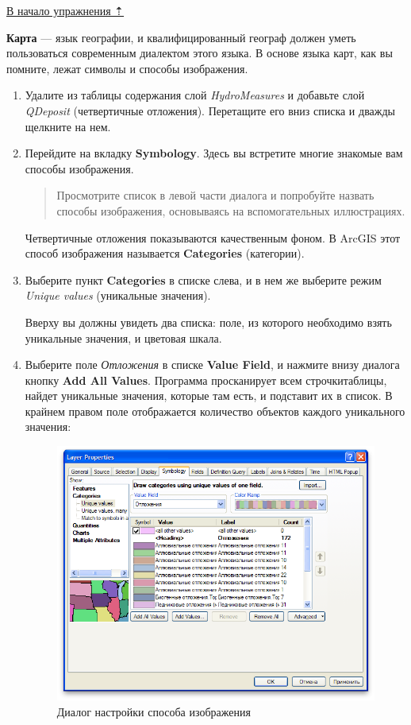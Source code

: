 \documentclass[]{book}
\theoremstyle{definition}
\theoremstyle{definition}
\theoremstyle{definition}
\theoremstyle{remark}
\begin{document}
\protect\hyperlink{map-design-quaternary}{В начало упражнения ⇡}

\textbf{Карта} --- язык географии, и квалифицированный географ должен
уметь пользоваться современным диалектом этого языка. В основе языка
карт, как вы помните, лежат символы и способы изображения.

\begin{enumerate}
\def\labelenumi{\arabic{enumi}.}
\item
  Удалите из таблицы содержания слой \emph{HydroMeasures} и добавьте
  слой \emph{QDeposit} (четвертичные отложения). Перетащите его вниз
  списка и дважды щелкните на нем.
\item
  Перейдите на вкладку \textbf{Symbology}. Здесь вы встретите многие
  знакомые вам способы изображения.

  \begin{quote}
  Просмотрите список в левой части диалога и попробуйте назвать способы
  изображения, основываясь на вспомогательных иллюстрациях.
  \end{quote}

  Четвертичные отложения показываются качественным фоном. В ArcGIS этот
  способ изображения называется \textbf{Categories} (категории).
\item
  Выберите пункт \textbf{Categories} в списке слева, и в нем же выберите
  режим \emph{Unique values} (уникальные значения).

  Вверху вы должны увидеть два списка: поле, из которого необходимо
  взять уникальные значения, и цветовая шкала.
\item
  Выберите поле \emph{Отложения} в списке \textbf{Value Field}, и
  нажмите внизу диалога кнопку \textbf{Add All Values}. Программа
  просканирует всем строчкитаблицы, найдет уникальные значения, которые
  там есть, и подставит их в список. В крайнем правом поле отображается
  количество объектов каждого уникального значения:

  \begin{figure}
  \centering
  \includegraphics{images/Ex01/image15.png}
  \caption{Диалог настройки способа изображения}
  \end{figure}


\end{enumerate}
\end{document}
